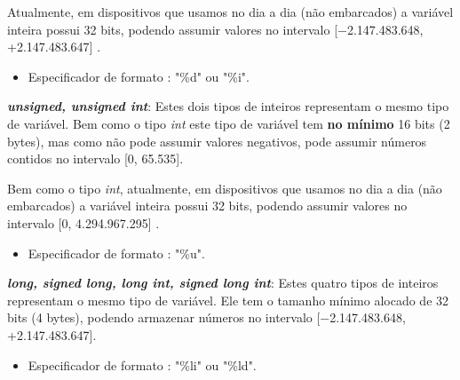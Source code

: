 \documentclass[12pt]{article}
\newcommand\tab[1][1cm]{\hspace*{#1}}
\begin{document}
\hspace{0.25cm}
\begin{tcolorbox}[colback=green!5!white,colframe=green!75!black,title=Curiosidade]
  \par\tab Atualmente, em dispositivos que usamos no dia a dia (não embarcados) a variável inteira possui 32 bits, podendo assumir valores no intervalo  [−2.147.483.648, +2.147.483.647] \cite{presentation:intro_pe}.
\end{tcolorbox}

\begin{itemize}
    \item Especificador de formato : "\%d" ou "\%i".
\end{itemize}

\hspace{0.2cm}
\par\textbf{\textit{unsigned, unsigned int}}: Estes dois tipos de inteiros representam o mesmo tipo de variável. Bem como o tipo \textit{int} este tipo de variável tem \textbf{no mínimo} 16 bits (2 bytes), mas como não pode assumir valores negativos, pode assumir números contidos no intervalo  [0, 65.535].

\hspace{0.25cm}
\begin{tcolorbox}[colback=green!5!white,colframe=green!75!black,title=Curiosidade]
  \par\tab Bem como o tipo \textit{int}, atualmente, em dispositivos que usamos no dia a dia (não embarcados) a variável inteira possui 32 bits, podendo assumir valores no intervalo  [0, 4.294.967.295] \cite{presentation:intro_pe}.
\end{tcolorbox}

\begin{itemize}
    \item Especificador de formato : "\%u".
\end{itemize}

\hspace{0.2cm}
\par\textbf{\textit{long, signed long, long int, signed long int}}: Estes quatro tipos de inteiros representam o mesmo tipo de variável. Ele tem o tamanho mínimo alocado de 32 bits (4 bytes), podendo armazenar números no intervalo [−2.147.483.648, +2.147.483.647].

\begin{itemize}
    \item Especificador de formato : "\%li" ou "\%ld".
\end{itemize}
\end{document}
